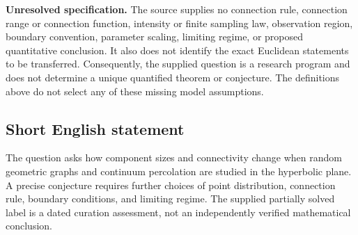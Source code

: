 \documentclass[11pt]{article}
\begin{document}
\textbf{Unresolved specification.} The source supplies no connection rule, connection range or connection function, intensity or finite sampling law, observation region, boundary convention, parameter scaling, limiting regime, or proposed quantitative conclusion. It also does not identify the exact Euclidean statements to be transferred. Consequently, the supplied question is a research program and does not determine a unique quantified theorem or conjecture. The definitions above do not select any of these missing model assumptions.
\subsection{Short English statement}
The question asks how component sizes and connectivity change when random geometric graphs and continuum percolation are studied in the hyperbolic plane. A precise conjecture requires further choices of point distribution, connection rule, boundary conditions, and limiting regime. The supplied partially solved label is a dated curation assessment, not an independently verified mathematical conclusion.
\end{document}
